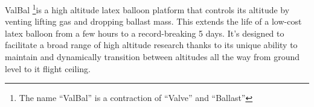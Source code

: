 \documentclass[12pt, twocolumn]{article}
\begin{document}
\thispagestyle{empty}\sffamily

\noindent ValBal \footnote{\sffamily The name ``ValBal'' is a contraction of ``Valve'' and ``Ballast''}is a high altitude latex balloon platform that controls its altitude by venting lifting gas and dropping ballast mass. This extends the life of a low-cost latex balloon from a few hours to a record-breaking 5 days. It's designed to facilitate a broad range of high altitude research thanks to its unique ability to maintain and dynamically transition between altitudes all the way from ground level to it flight ceiling.

\end{document}
